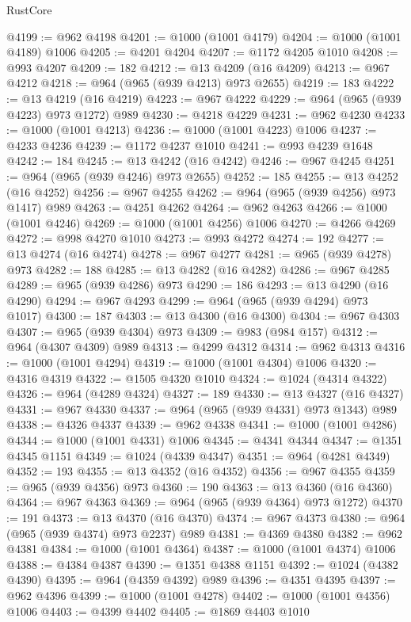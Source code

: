 \begin{lexlean}{RustCore}
\begin{coremodule}
@4199 := @962 @4198
@4201 := @1000 (@1001 @4179)
@4204 := @1000 (@1001 @4189) @1006
@4205 := @4201 @4204
@4207 := @1172 @4205 @1010
@4208 := @993 @4207
@4209 := 182
@4212 := @13 @4209 (@16 @4209)
@4213 := @967 @4212
@4218 := @964 (@965 (@939 @4213) @973 @2655)
@4219 := 183
@4222 := @13 @4219 (@16 @4219)
@4223 := @967 @4222
@4229 := @964 (@965 (@939 @4223) @973 @1272) @989
@4230 := @4218 @4229
@4231 := @962 @4230
@4233 := @1000 (@1001 @4213)
@4236 := @1000 (@1001 @4223) @1006
@4237 := @4233 @4236
@4239 := @1172 @4237 @1010
@4241 := @993 @4239 @1648
@4242 := 184
@4245 := @13 @4242 (@16 @4242)
@4246 := @967 @4245
@4251 := @964 (@965 (@939 @4246) @973 @2655)
@4252 := 185
@4255 := @13 @4252 (@16 @4252)
@4256 := @967 @4255
@4262 := @964 (@965 (@939 @4256) @973 @1417) @989
@4263 := @4251 @4262
@4264 := @962 @4263
@4266 := @1000 (@1001 @4246)
@4269 := @1000 (@1001 @4256) @1006
@4270 := @4266 @4269
@4272 := @998 @4270 @1010
@4273 := @993 @4272
@4274 := 192
@4277 := @13 @4274 (@16 @4274)
@4278 := @967 @4277
@4281 := @965 (@939 @4278) @973
@4282 := 188
@4285 := @13 @4282 (@16 @4282)
@4286 := @967 @4285
@4289 := @965 (@939 @4286) @973
@4290 := 186
@4293 := @13 @4290 (@16 @4290)
@4294 := @967 @4293
@4299 := @964 (@965 (@939 @4294) @973 @1017)
@4300 := 187
@4303 := @13 @4300 (@16 @4300)
@4304 := @967 @4303
@4307 := @965 (@939 @4304) @973
@4309 := @983 (@984 @157)
@4312 := @964 (@4307 @4309) @989
@4313 := @4299 @4312
@4314 := @962 @4313
@4316 := @1000 (@1001 @4294)
@4319 := @1000 (@1001 @4304) @1006
@4320 := @4316 @4319
@4322 := @1505 @4320 @1010
@4324 := @1024 (@4314 @4322)
@4326 := @964 (@4289 @4324)
@4327 := 189
@4330 := @13 @4327 (@16 @4327)
@4331 := @967 @4330
@4337 := @964 (@965 (@939 @4331) @973 @1343) @989
@4338 := @4326 @4337
@4339 := @962 @4338
@4341 := @1000 (@1001 @4286)
@4344 := @1000 (@1001 @4331) @1006
@4345 := @4341 @4344
@4347 := @1351 @4345 @1151
@4349 := @1024 (@4339 @4347)
@4351 := @964 (@4281 @4349)
@4352 := 193
@4355 := @13 @4352 (@16 @4352)
@4356 := @967 @4355
@4359 := @965 (@939 @4356) @973
@4360 := 190
@4363 := @13 @4360 (@16 @4360)
@4364 := @967 @4363
@4369 := @964 (@965 (@939 @4364) @973 @1272)
@4370 := 191
@4373 := @13 @4370 (@16 @4370)
@4374 := @967 @4373
@4380 := @964 (@965 (@939 @4374) @973 @2237) @989
@4381 := @4369 @4380
@4382 := @962 @4381
@4384 := @1000 (@1001 @4364)
@4387 := @1000 (@1001 @4374) @1006
@4388 := @4384 @4387
@4390 := @1351 @4388 @1151
@4392 := @1024 (@4382 @4390)
@4395 := @964 (@4359 @4392) @989
@4396 := @4351 @4395
@4397 := @962 @4396
@4399 := @1000 (@1001 @4278)
@4402 := @1000 (@1001 @4356) @1006
@4403 := @4399 @4402
@4405 := @1869 @4403 @1010

\end{coremodule}
\end{lexlean}
